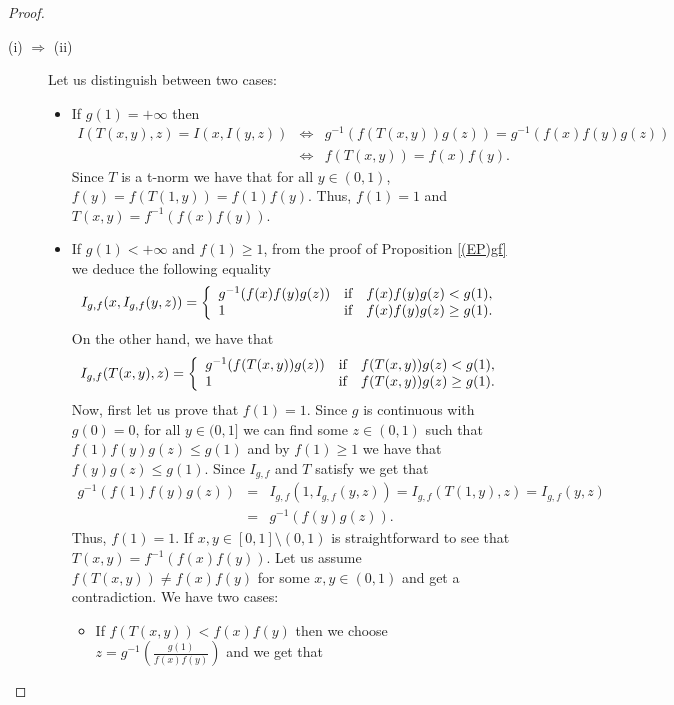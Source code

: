 \begin{proof}\hspace{0.5cm}
	\begin{description}
	\item[(i) $\Rightarrow$ (ii)] Let us distinguish between two cases:
	\begin{itemize}
		\item If $g(1)=+\infty$ then
		\begin{eqnarray*}
			I(T(x,y),z)=I(x,I(y,z)) & \Leftrightarrow & g^{-1}(f(T(x,y))g(z))=g^{-1}(f(x)f(y)g(z)) \\ & \Leftrightarrow & f(T(x,y))=f(x)f(y).
		\end{eqnarray*}
		Since $T$ is a t-norm we have that for all $y \in(0,1)$, $f(y)=f(T(1,y)) =f(1)f(y)$. Thus, $f(1)=1$ and $T(x,y)=f^{-1}(f(x)f(y))$.
		\item If $g(1)<+\infty$ and $f(1) \geq 1$, from the proof of Proposition \ref{(EP)gf}  we deduce the following equality
		$$I_{g,f}(x,I_{g,f}(y,z))=  \left\{ \begin{array}{lcc}
			g^{-1}(f(x)f(y)g(z)) &   \hbox{if}  & f(x)f(y)g(z) < g(1), 
			\\ 1 &  \hbox{if} & f(x)f(y)g(z) \geq g(1). \\
		\end{array}
		\right. 
		$$
		On the other hand, we have that
		$$I_{g,f}(T(x,y),z)= \left\{ \begin{array}{lcc}
			g^{-1}(f(T(x,y))g(z)) &   \hbox{if}  & f(T(x,y))g(z) < g(1), 
			\\ 1 &  \hbox{if} & f(T(x,y))g(z) \geq g(1). \\
		\end{array}
		\right. 
		$$
		Now, first let us prove that $f(1)= 1$. Since $g$ is continuous with $g(0)=0$, for all $y \in (0,1]$ we can find some $ z \in (0,1)$ such that $f(1)f(y)g(z) \leq g(1)$ and by $f(1) \geq 1$ we have that $f(y)g(z) \leq g(1)$. Since $I_{g,f}$ and $T$ satisfy \LI we get that
		\begin{eqnarray*}
		g^{-1}(f(1)f(y)g(z))&=&I_{g,f}(1,I_{g,f}(y,z))=I_{g,f}(T(1,y),z)=I_{g,f}(y,z)\\
		&=&g^{-1}(f(y)g(z)).
		\end{eqnarray*}
		Thus, $f(1)=1$. If $x,y \in [0,1] \setminus (0,1)$ is straightforward to see that $T(x,y)=f^{-1}(f(x)f(y))$. Let us assume $f(T(x,y)) \not = f(x)f(y)$ for some $x,y \in (0,1)$ and get a contradiction. We have two cases:
		\begin{itemize}
			\item If $f(T(x,y)) < f(x)f(y)$ then we choose $z = g^{-1}\left(\frac{g(1)}{f(x)f(y)}\right)$ and we get that

\end{itemize}
\end{itemize}
\end{description}
\end{proof}
